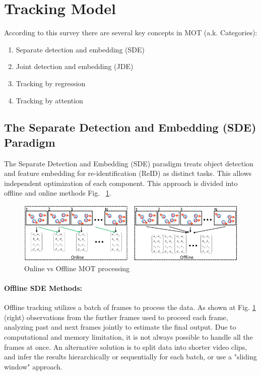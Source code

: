 \documentclass[12pt, a4paper]{article}
\begin{document}
\section{Tracking Model} 

According to this survey \cite{sota-trackets-survey} there are several key concepts in MOT (a.k. Categories):

\begin{enumerate}
	\item Separate detection and embedding (SDE) 
	\item Joint detection and embedding (JDE) 
	\item Tracking by regression 
	\item Tracking by attention 
\end{enumerate}
 

\subsection{The Separate Detection and Embedding (SDE) Paradigm}
\label{sec:Separate_Detection_Embedding}

The Separate Detection and Embedding (SDE) paradigm treats object detection and feature embedding for re-identification (ReID) as distinct tasks. This allows independent optimization of each component. This approach is divided into offline and online methods Fig. ~\ref{fig:online_offline}. 

\begin{figure}[h]
    \centering
    \includegraphics[width=0.95\linewidth]{pictures/online_offline.png}
    \caption{Online vs Offline MOT processing}
    \label{fig:online_offline}
\end{figure}

\paragraph{Offline SDE Methods:}
Offline tracking utilizes a batch of frames to process the data. As shown at Fig. \ref{fig:online_offline} (right) observations from the further frames used to proceed each frame, analyzing past and next frames  jointly to estimate the final output. Due to computational and memory limitation, it is not always possible to handle all the frames at once. An alternative solution is to split data into shorter video clips, and infer the results hierarchically or sequentially for each batch, or use a "sliding window" approach. 
\end{document}
